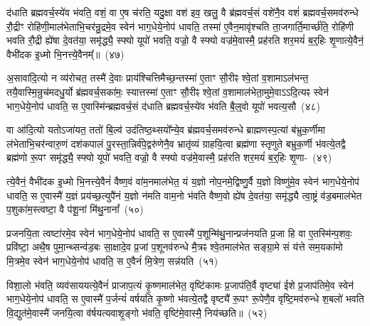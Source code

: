 द॑धाति ब्रह्मवर्च॒स्ये॑व भ॑वति॒ वशं॒ वा ए॒ष च॑रति॒ यदु॒क्षा वश॑ इव॒ खलु॒ वै ब्र॑ह्मवर्च॒सं वशे॑नै॒व वशं॑ ब्रह्मवर्च॒समव॑\-रुन्धे रौ॒द्रीꣳ रोहि॑णी॒माल॑भेताभि॒चर॑न्रु॒द्रमे॒व स्वेन॑ भाग॒धेये॒नोप॑ धावति॒ तस्मा॑ ए॒वैन॒मावृ॑श्चति ता॒जगार्ति॒मार्च्छ॑ति॒ रोहि॑णी भवति रौ॒द्री ह्ये॑षा दे॒वत॑या॒ समृ॑द्ध्यै॒ स्फ्यो यूपो॑ भवति॒ वज्रो॒ वै स्फ्यो वज्र॑मे॒वास्मै॒ प्रह॑रति शर॒मयं॑ ब॒र्॒\mbox{}हिः शृ॒णात्ये॒वैनं॒ वैभी॑दक इ॒ध्मो भि॒नत्त्ये॒वैनम्᳚॥~(४७)

{\anuvakamend[{अ॒भि खलु॒ वृष्टि॒श्छन्द॑सामे॒व रसे॑न प्र॒जामव॑ वैश्वदे॒वा वै ब्र॑ह्मवर्च॒सं यूप॒ एका॒न्नविꣳ॑श॒तिश्च॑।}]}

अ॒सावा॑दि॒त्यो न व्य॑रोचत॒ तस्मै॑ दे॒वाः प्राय॑श्चित्ति\-मैच्छ॒न्तस्मा॑ ए॒ताꣳ सौ॒रीꣴ श्वे॒तां व॒शामा\-ऽल॑भन्त॒ तयै॒वास्मि॒न्रुच॑मदधु॒र्यो ब्र॑ह्मवर्च॒सका॑मः॒ स्यात्तस्मा॑ ए॒ताꣳ सौ॒रीꣴ श्वे॒तां व॒शामाल॑भेता॒मुमे॒\-वा\-ऽऽ\-\-दि॒त्यꣴ स्वेन॑ भाग॒धेये॒नोप॑ धावति॒ स ए॒वास्मि॑न्ब्रह्मवर्च॒सं द॑धाति ब्रह्मवर्च॒स्ये॑व भ॑वति बै॒ल्॒\mbox{}वो यूपो॑ भवत्य॒सौ~(४८)

वा आ॑दि॒त्यो यतो\-ऽजा॑यत॒ ततो॑ बि॒ल्व॑ उद॑तिष्ठ॒थ्सयो᳚न्ये॒व ब्र॑ह्मवर्च॒समव॑\-रुन्धे ब्राह्मणस्प॒त्यां ब॑भ्रुक॒र्णीमा ल॑भेताभि॒\-चर॑न्वारु॒णं दश॑\-कपालं पु॒रस्ता॒न्निर्व॑पे॒द्वरु॑णेनै॒व भ्रातृ॑व्यं ग्राहयि॒त्वा ब्रह्म॑णा स्तृणुते बभ्रुक॒र्णी भ॑वत्ये॒तद्वै ब्रह्म॑णो रू॒पꣳ समृ॑द्ध्यै॒ स्फ्यो यूपो॑ भवति॒ वज्रो॒ वै स्फ्यो वज्र॑मे॒वास्मै॒ प्रह॑रति शर॒मयं॑ ब॒र्॒\mbox{}हिः शृ॒णा-~(४९)

त्ये॒वैनं॒ वैभी॑दक इ॒ध्मो भि॒नत्त्ये॒वैनं॑ वैष्ण॒वं वा॑म॒नमा\-ल॑भेत॒ यं य॒ज्ञो नोप॒नमे॒द्विष्णु॒र्वै य॒ज्ञो विष्णु॑मे॒व स्वेन॑ भाग॒धेये॒नोप॑ धावति॒ स ए॒वास्मै॑ य॒ज्ञं प्रय॑च्छ॒त्युपै॑नं य॒ज्ञो न॑मति वाम॒नो भ॑वति वैष्ण॒वो ह्ये॑ष दे॒वत॑या॒ समृ॑द्ध्यै त्वा॒ष्ट्रं व॑ड॒बमाल॑भेत प॒शुका॑म॒स्त्वष्टा॒ वै प॑शू॒नां मि॑थु॒नानां᳚~(५०)

प्रजनयि॒ता त्वष्टा॑रमे॒व स्वेन॑ भाग॒धेये॒नोप॑ धावति॒ स ए॒वास्मै॑ प॒शून्मि॑थु॒नान्प्रज॑नयति प्र॒जा हि वा ए॒तस्मि॑न्प॒शवः॒ प्रवि॑ष्टा॒ अथै॒ष पुमा॒न्थ्सन्व॑ड॒बः सा॒क्षादे॒व प्र॒जां प॒शूनव॑\-रुन्धे मै॒त्रꣴ श्वे॒तमाल॑भेत सङ्ग्रा॒मे सं य॑त्ते सम॒यका॑मो मि॒त्रमे॒व स्वेन॑ भाग॒धेये॒नोप॑ धावति॒ स ए॒वैनं॑ मि॒त्रेण॒ सन्न॑यति~(५१)

विशा॒लो भ॑वति॒ व्यव॑साययत्ये॒वैनं॑ प्राजाप॒त्यं कृ॒ष्णमा\-ल॑भेत॒ वृष्टि॑कामः प्र॒जा\-प॑ति॒र्वै वृष्ट्या॑ ईशे प्र॒जा\-प॑तिमे॒व स्वेन॑ भाग॒धेये॒नोप॑ धावति॒ स ए॒वास्मै॑ प॒र्जन्यं॑ वर्\mbox{}षयति कृ॒ष्णो भ॑वत्ये॒तद्वै वृष्ट्यै॑ रू॒पꣳ रू॒पेणै॒व वृष्टि॒मव॑\-रुन्धे श॒बलो॑ भवति वि॒द्युत॑मे॒वास्मै॑ जनयि॒त्वा व॑र्\mbox{}षयत्यवाशृ॒ङ्गो भ॑वति॒ वृष्टि॑मे॒वास्मै॒ निय॑च्छति॥~(५२)

